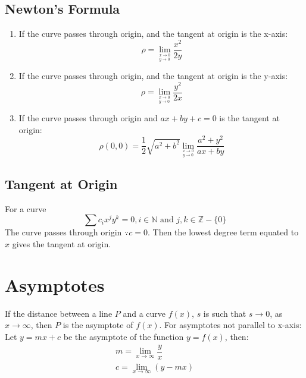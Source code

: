 \subsection{Newton's Formula}
\begin{enumerate}
	\item If the curve passes through origin, and the tangent at origin is the x-axis:
	\begin{equation}
		\rho=\lim_{^{x\to0}_{y\to0}} \dfrac{x^2}{2y}
	\end{equation}
	\item If the curve passes through origin, and the tangent at origin is the y-axis:
	\begin{equation}
		\rho=\lim_{^{x\to0}_{y\to0}} \dfrac{y^2}{2x}
	\end{equation}
	\item If the curve passes through origin and $ax+by+c=0$ is the tangent at origin:
	\begin{equation}
		\rho(0,0)=\dfrac{1}{2}\sqrt{a^2+b^2} \lim_{^{x\to0}_{y\to0}} \dfrac{a^2+y^2}{ax+by}
	\end{equation}
\end{enumerate}

\subsection{Tangent at Origin}
For a curve
\begin{equation}
	\sum c_i x^j y^k=0, i\in\mathbb{N}\text{ and }j,k\in\mathbb{Z}-\lbrace 0 \rbrace
\end{equation}
The curve passes through origin $\because c=0$. Then the lowest degree term equated to $x$ gives the tangent at origin.

\section{Asymptotes}
If the distance between a line $P$ and a curve $f(x)$, $s$ is such that $s\to0$, as $x\to\infty$, then $P$ is the asymptote of $f(x)$. For asymptotes not parallel to x-axis:\newline
Let $y=mx+c$ be the asymptote of the function $y=f(x)$, then:
\begin{align}
	m=\lim_{x\to\infty} \dfrac{y}{x}\\
	c=\lim_{x\to\infty} (y-mx)
\end{align}


